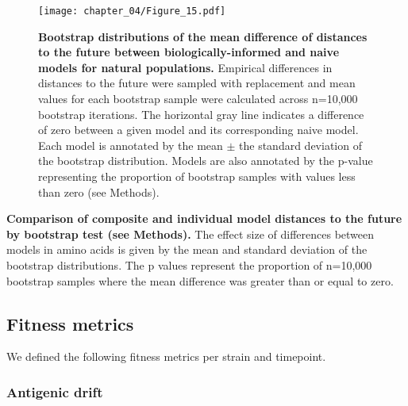 \begin{figure}
  \begin{center}
  \texttt{[image: chapter\_04/Figure\_15.pdf]}
  \caption[{Bootstrap distributions of the mean difference of distances to the future between biologically-informed and naive models for natural populations.}]{
  {\bf Bootstrap distributions of the mean difference of distances to the future between biologically-informed and naive models for natural populations.}
  Empirical differences in distances to the future were sampled with replacement and mean values for each bootstrap sample were calculated across n=10,000 bootstrap iterations.
  The horizontal gray line indicates a difference of zero between a given model and its corresponding naive model.
  Each model is annotated by the mean $\pm$ the standard deviation of the bootstrap distribution.
  Models are also annotated by the p-value representing the proportion of bootstrap samples with values less than zero (see Methods).
  }
  \label{fig:bootstrap_distributions_for_natural_sample_1_with_90_vpm_sliding}
  \end{center}
\end{figure}

\begin{table}
  \begin{center}
    \scalebox{0.65}{
        
    }
    \caption[{Comparison of composite and individual model distances to the future by bootstrap test (see Methods).}]{
      {\bf Comparison of composite and individual model distances to the future by bootstrap test (see Methods).}
      The effect size of differences between models in amino acids is given by the mean and standard deviation of the bootstrap distributions.
      The p values represent the proportion of n=10,000 bootstrap samples where the mean difference was greater than or equal to zero.
    }
    \label{table:composite_vs_individual_model_comparison}
  \end{center}
\end{table}

\subsection{Fitness metrics}

We defined the following fitness metrics per strain and timepoint.

\subsubsection{Antigenic drift}

